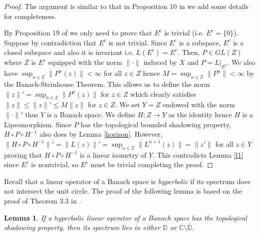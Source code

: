 \documentclass[11pt,letterpaper]{amsart}
\newtheorem{lem}{Lemma}
\numberwithin{equation}{section}
\begin{document}
\begin{proof}
The argument is similar to that in Proposition 10 in \cite{lm} we add some details for completeness.

By Proposition 19 of \cite{bcdmp} we only need to prove that $E^c$ is trivial (i.e. $E^c=\{0\}$).
Suppose by contradiction that $E^c$ is not trivial.
Since $E^c$ is a subspace, $E^c$ is a closed subspace and also it is invariant i.e.
$L(E^c)=E^c$.
Then, $P\in GL(Z)$ where $Z$ is $E^c$ equipped with the norm $\|\cdot\|$ induced by $X$
and $P=L|_{E^c}$.
We also have $\sup_{n\in \mathbb{Z}}\|P^n(z)\|<\infty$ for all $z\in Z$
hence $M=\sup_{n\in\mathbb{Z}}\|P^n\|<\infty$ by the Banach-Steinhouse Theorem.
This allows us to define the norm
$\|z\|'=\sup_{n\in\mathbb{Z}}\|P^n(z)\|$ for $z\in Z$ which clearly satisfies
$\|z\|\leq \|z\|'\leq M\|z\|$ for $z\in Z$.
We set $Y=Z$ endowed with the norm $\|\cdot\|'$ thus $Y$ is a Banach space.
We define $H:Z\to Y$ as the identity hence $H$ is a Lipeomorphism.
Since $P$ has the topological bounded shadowing property, $H\circ P\circ H^{-1}$ also does by Lemma \ref{horizon}.
However,
$\|H\circ P\circ H^{-1}\|'=\|L(z)\|'=\sup_{n\in\mathbb{Z}}\|L^{n+1}(z)\|=\|z'\|$ for all $z\in Y$ proving that $H\circ P\circ H^{-1}$ is a linear isometry of $Y$.
This contradicts Lemma \ref{l1} since $E^c$ is nontrivial, so $E^c$ must be trivial completing the proof.
\end{proof}


Recall that a linear operator of a Banach space is {\em hyperbolic} if its spectrum does not intersect the unit circle.
The proof of the following lemma is based on the proof of Theorem 3.3 in \cite{c}.


\begin{lem}
\label{sim}
If a hyperbolic linear operator of a Banach space
has the topological shadowing property, then its spectrum lies in either $\mathbb{D}$ or $\mathbb{C} \setminus \overline{\mathbb{D}}$.
\end{lem}
\end{document}
